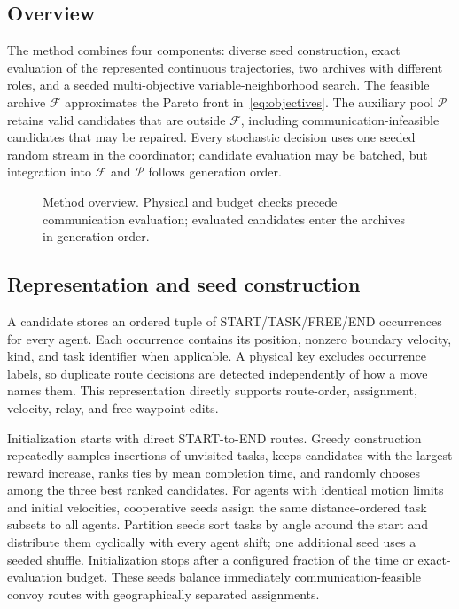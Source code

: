 \subsection{Overview}
The method combines four components: diverse seed construction, exact evaluation of the represented continuous trajectories, two archives with different roles, and a seeded multi-objective variable-neighborhood search. The feasible archive $\mathcal F$ approximates the Pareto front in~\eqref{eq:objectives}. The auxiliary pool $\mathcal P$ retains valid candidates that are outside $\mathcal F$, including communication-infeasible candidates that may be repaired. Every stochastic decision uses one seeded random stream in the coordinator; candidate evaluation may be batched, but integration into $\mathcal F$ and $\mathcal P$ follows generation order.

\begin{figure}[t]
\centering
{}
\caption{Method overview. Physical and budget checks precede communication evaluation; evaluated candidates enter the archives in generation order.}
\label{fig:method_overview}
\end{figure}

\subsection{Representation and seed construction}
A candidate stores an ordered tuple of START/TASK/FREE/END occurrences for every agent. Each occurrence contains its position, nonzero boundary velocity, kind, and task identifier when applicable. A physical key excludes occurrence labels, so duplicate route decisions are detected independently of how a move names them. This representation directly supports route-order, assignment, velocity, relay, and free-waypoint edits.

Initialization starts with direct START-to-END routes. Greedy construction repeatedly samples insertions of unvisited tasks, keeps candidates with the largest reward increase, ranks ties by mean completion time, and randomly chooses among the three best ranked candidates. For agents with identical motion limits and initial velocities, cooperative seeds assign the same distance-ordered task subsets to all agents. Partition seeds sort tasks by angle around the start and distribute them cyclically with every agent shift; one additional seed uses a seeded shuffle. Initialization stops after a configured fraction of the time or exact-evaluation budget. These seeds balance immediately communication-feasible convoy routes with geographically separated assignments.

